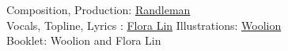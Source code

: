 
\vspace*{\fill}


Composition, Production: \href{https://linktr.ee/randleman}{Randleman}\\
Vocals, Topline, Lyrics : \href{https://www.youtube.com/channel/UC7pM7YKe9U1D1Xl4s_xroBw}{Flora Lin}
Illustrations: \href{https://twitter.com/wooliondraws}{Woolion}\\
Booklet: Woolion and Flora Lin

